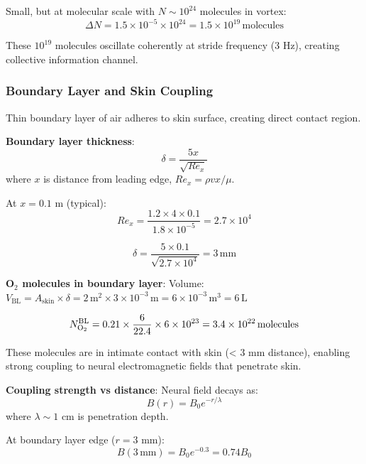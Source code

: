 \documentclass[11pt,onecolumn]{article}
\begin{document}
Small, but at molecular scale with $N \sim 10^{24}$ molecules in vortex:
\begin{equation}
\Delta N = 1.5 \times 10^{-5} \times 10^{24} = 1.5 \times 10^{19}\,\text{molecules}
\end{equation}

These $10^{19}$ molecules oscillate coherently at stride frequency (3 Hz), creating collective information channel.

\subsubsection{Boundary Layer and Skin Coupling}

Thin boundary layer of air adheres to skin surface, creating direct contact region.

\textbf{Boundary layer thickness}:
\begin{equation}
\delta = \frac{5x}{\sqrt{Re_x}}
\end{equation}
where $x$ is distance from leading edge, $Re_x = \rho v x / \mu$.

At $x = 0.1$ m (typical):
\begin{equation}
Re_x = \frac{1.2 \times 4 \times 0.1}{1.8 \times 10^{-5}} = 2.7 \times 10^4
\end{equation}

\begin{equation}
\delta = \frac{5 \times 0.1}{\sqrt{2.7 \times 10^4}} = 3\,\text{mm}
\end{equation}

\textbf{O$_2$ molecules in boundary layer}:
Volume: $V_{\text{BL}} = A_{\text{skin}} \times \delta = 2\,\text{m}^2 \times 3 \times 10^{-3}\,\text{m} = 6 \times 10^{-3}\,\text{m}^3 = 6\,\text{L}$

\begin{equation}
N_{\ce{O2}}^{\text{BL}} = 0.21 \times \frac{6}{22.4} \times 6 \times 10^{23} = 3.4 \times 10^{22}\,\text{molecules}
\end{equation}

These molecules are in intimate contact with skin (< 3 mm distance), enabling strong coupling to neural electromagnetic fields that penetrate skin.

\textbf{Coupling strength vs distance}:
Neural field decays as:
\begin{equation}
B(r) = B_0 e^{-r/\lambda}
\end{equation}
where $\lambda \sim 1$ cm is penetration depth.

At boundary layer edge ($r = 3$ mm):
\begin{equation}
B(3\,\text{mm}) = B_0 e^{-0.3} = 0.74 B_0
\end{equation}
\end{document}
